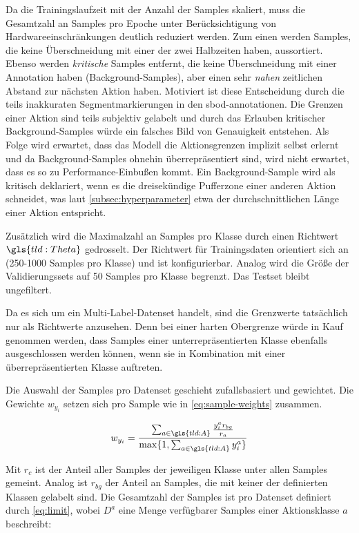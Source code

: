 Da die Trainingslaufzeit mit der Anzahl der Samples skaliert, muss die Gesamtzahl an Samples pro Epoche unter Berücksichtigung von Hardwareeinschränkungen deutlich reduziert werden.
Zum einen werden Samples, die keine Überschneidung mit einer der zwei Halbzeiten haben, aussortiert.
Ebenso werden \emph{kritische} Samples entfernt, die keine Überschneidung mit einer Annotation haben (Background-Samples), aber einen sehr \emph{nahen} zeitlichen Abstand zur nächsten Aktion haben.
Motiviert ist diese Entscheidung durch die teils inakkuraten Segmentmarkierungen in den \gls{sbod}-\gls{annotationen}.
Die Grenzen einer Aktion sind teils subjektiv gelabelt und durch das Erlauben kritischer Background-Samples würde ein falsches Bild von Genauigkeit entstehen.
Als Folge wird erwartet, dass das Modell die Aktionsgrenzen implizit selbst erlernt und da Background-Samples ohnehin überrepräsentiert sind, wird nicht erwartet, dass es so zu Performance-Einbußen kommt.
Ein Background-Sample wird als kritisch deklariert, wenn es die dreisekündige Pufferzone einer anderen Aktion schneidet, was laut \autoref{subsec:hyperparameter} etwa der durchschnittlichen Länge einer Aktion entspricht.

Zusätzlich wird die Maximalzahl an Samples pro Klasse durch einen Richtwert $\gls{tld:Theta}$ gedrosselt.
Der Richtwert für Trainingsdaten orientiert sich an~\cite{Kay17} (250-1000 Samples pro Klasse) und ist konfigurierbar.
Analog wird die Größe der Validierungssets auf 50 Samples pro Klasse begrenzt.
Das Testset bleibt ungefiltert.

Da es sich um ein Multi-Label-Datenset handelt, sind die Grenzwerte tatsächlich nur als Richtwerte anzusehen.
Denn bei einer harten Obergrenze würde in Kauf genommen werden, dass Samples einer unterrepräsentierten Klasse ebenfalls ausgeschlossen werden können, wenn sie in Kombination mit einer überrepräsentierten Klasse auftreten.

Die Auswahl der Samples pro Datenset geschieht zufallsbasiert und gewichtet.
Die Gewichte $w_{y_i}$ setzen sich pro Sample wie in \autoref{eq:sample-weights} zusammen.

\begin{equation}
    \label{eq:sample-weights}
    w_{y_i} = \frac{\sum_{a \in \gls{tld:A}} \frac{y_i^a r_{bg}}{r_a} }{\max \{1, \sum_{a \in \gls{tld:A}} y_i^a\}}
\end{equation}

Mit $r_{c}$ ist der Anteil aller Samples der jeweiligen Klasse unter allen Samples gemeint.
Analog ist $r_{bg}$ der Anteil an Samples, die mit keiner der definierten Klassen gelabelt sind.
Die Gesamtzahl der Samples ist pro Datenset definiert durch \autoref{eq:limit}, wobei $D^a$ eine Menge verfügbarer Samples einer Aktionsklasse $a$ beschreibt:

